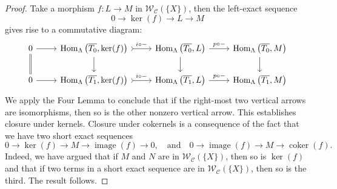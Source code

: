 \documentclass[10pt,twoside, a4paper,reqno]{amsart}
\DeclareMathOperator{\Hom}{Hom}
\DeclareMathOperator{\coker}{coker}
\DeclareMathOperator{\image}{image}
\newcommand{\calC}{\mathcal{C}}
\newcommand{\calW}{\mathcal{W}}
\theoremstyle{definition}
\begin{document}
\begin{proof}
    
    Take a morphism $f: L \to M$ in $\calW_{\calC}(\{X\})$, then the left-exact sequence 
    \[ 0 \to \ker(f) \to L \to M \]
    gives rise to a commutative diagram:
    \begin{equation*}
        \begin{tikzcd}
0 \arrow[r] \arrow[d, equal] & {\Hom_{\Lambda}\big(\overline{T_0},\ker(f) \big)} \arrow[r, "i\circ -", tail] \arrow[d] & {\Hom_{\Lambda}\big(\overline{T_0},L\big)} \arrow[r, "p\circ -"] \arrow[d] & {\Hom_{\Lambda}\big(\overline{T_0},M\big)} \arrow[d] \\
0 \arrow[r] & {\Hom_{\Lambda}\big(\overline{T_1},\ker(f)  \big)} \arrow[r, "i\circ -", tail]           & {\Hom_{\Lambda}\big(\overline{T_1},L\big)} \arrow[r, "p\circ -"]           & {\Hom_{\Lambda}\big(\overline{T_1},M\big)}               
\end{tikzcd}
    \end{equation*}
    We apply the Four Lemma to conclude that if the right-most two vertical arrows are isomorphisms, then so is the other nonzero vertical arrow. This establishes closure under kernels. Closure under cokernels is a consequence of the fact that we have two short exact sequences
    \[ 0 \to \ker(f) \to M \to \image(f) \to 0, \quad\text{and} \quad 0 \to \image(f) \to M \to \coker(f). \]
    Indeed, we have argued that if $M$ and $N$ are in $\calW_{\calC}(\{X\})$, then so is $\ker(f)$ and that if two terms in a short exact sequence are in $\calW_{\calC}(\{X\})$, then so is the third. The result follows.


\end{proof}
\end{document}
